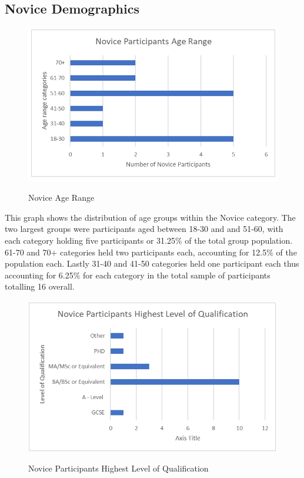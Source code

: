 \subsection{Novice Demographics}
\begin{figure}[H]
\includegraphics[width=\linewidth]{Screenshots/DemographicsQuestionaires/noviceAgeRange.png}
\label{NoviceAges}
\caption{Novice Age Range}
\end{figure}

This graph shows the distribution of age groups within the Novice category. The two largest groups were participants aged between 18-30 and and 51-60, with each category holding five participants or 31.25\% of the total group population. 61-70 and 70+ categories held two participants each, accounting for 12.5\% of the population each. Lastly 31-40 and 41-50 categories held one participant each thus accounting for 6.25\% for each category in the total sample of participants totalling 16 overall. 

\begin{figure}[H]
\includegraphics[width=\linewidth]{Screenshots/DemographicsQuestionaires/noviceEducation.png}
\label{NoviceQualifications}
\caption{Novice Participants Highest Level of Qualification}
\end{figure}

